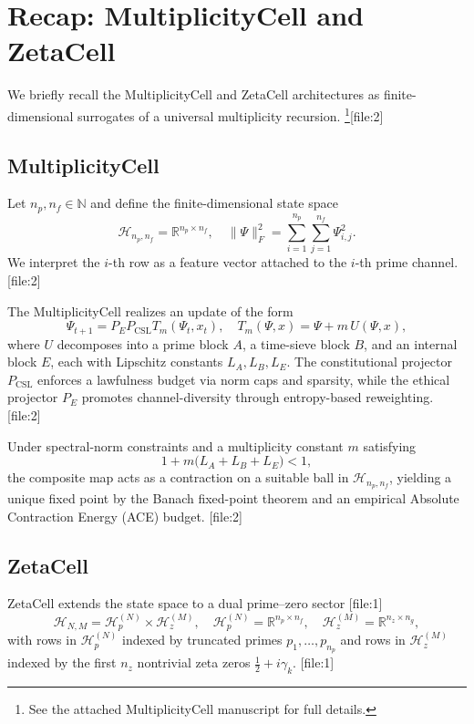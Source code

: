 \documentclass[11pt]{article}
\begin{document}
\section{Recap: MultiplicityCell and ZetaCell}

We briefly recall the MultiplicityCell and ZetaCell architectures as
finite-dimensional surrogates of a universal multiplicity recursion.%
\footnote{See the attached MultiplicityCell manuscript for full details.}[file:2]

\subsection{MultiplicityCell}

Let $n_p, n_f \in \mathbb{N}$ and define the finite-dimensional state space
\[
  \mathcal{H}_{n_p,n_f}
  = \mathbb{R}^{n_p \times n_f},
  \quad
  \|\Psi\|_F^2 = \sum_{i=1}^{n_p} \sum_{j=1}^{n_f} \Psi_{i,j}^2.
\]
We interpret the $i$-th row as a feature vector attached to the $i$-th
prime channel.%
[file:2]

The MultiplicityCell realizes an update of the form
\[
  \Psi_{t+1} = P_E P_{\mathrm{CSL}} T_m(\Psi_t, x_t),
  \quad
  T_m(\Psi, x) = \Psi + m \, U(\Psi, x),
\]
where $U$ decomposes into a prime block $A$, a time-sieve block $B$, and
an internal block $E$, each with Lipschitz constants $L_A, L_B, L_E$.
The constitutional projector $P_{\mathrm{CSL}}$ enforces a lawfulness
budget via norm caps and sparsity, while the ethical projector $P_E$
promotes channel-diversity through entropy-based reweighting.%
[file:2]

Under spectral-norm constraints and a multiplicity constant $m$ satisfying
\[
  1 + m \bigl(L_A + L_B + L_E\bigr) < 1,
\]
the composite map acts as a contraction on a suitable ball in
$\mathcal{H}_{n_p,n_f}$, yielding a unique fixed point by the Banach
fixed-point theorem and an empirical Absolute Contraction Energy (ACE)
budget.%
[file:2]

\subsection{ZetaCell}

ZetaCell extends the state space to a dual prime--zero sector%
[file:1]
\[
  \mathcal{H}_{N,M}
  = \mathcal{H}_p^{(N)} \times \mathcal{H}_z^{(M)},\quad
  \mathcal{H}_p^{(N)} = \mathbb{R}^{n_p \times n_f},\quad
  \mathcal{H}_z^{(M)} = \mathbb{R}^{n_z \times n_g},
\]
with rows in $\mathcal{H}_p^{(N)}$ indexed by truncated primes
$p_1,\dots,p_{n_p}$ and rows in $\mathcal{H}_z^{(M)}$ indexed by the
first $n_z$ nontrivial zeta zeros $\tfrac12 + i\gamma_k$.%
[file:1]
\end{document}
